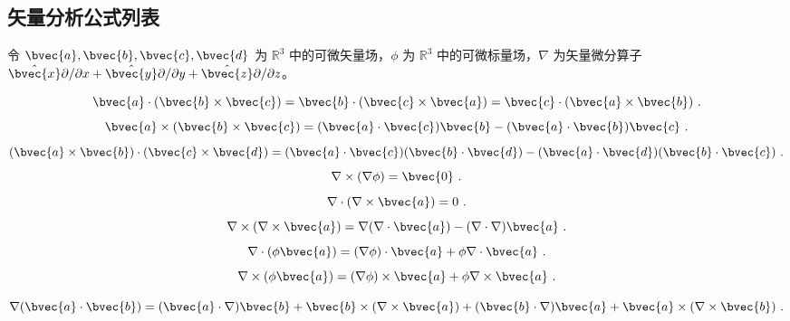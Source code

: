 
\begin{issues}
\end{issues}

\subsection{矢量分析公式列表}

令 $\bvec{a}, \bvec{b}, \bvec{c}, \bvec{d}$ 为 $\mathbb{R}^3$ 中的可微矢量场，$\phi$ 为 $\mathbb{R}^3$ 中的可微标量场，$\nabla$ 为矢量微分算子 $\hat{\bvec{x}}\partial/\partial{x}+\hat{\bvec{y}}\partial/\partial{y}+\hat{\bvec{z}}\partial/\partial{z}$。

\begin{equation}
\bvec{a}\cdot(\bvec{b}\times\bvec{c})=\bvec{b}\cdot(\bvec{c}\times\bvec{a})=\bvec{c}\cdot(\bvec{a}\times\bvec{b})~.
\end{equation}
\begin{equation}
\bvec{a}\times(\bvec{b}\times\bvec{c})=(\bvec{a}\cdot\bvec{c})\bvec{b}-(\bvec{a}\cdot\bvec{b})\bvec{c}~.
\end{equation}
\begin{equation}
(\bvec{a}\times\bvec{b})\cdot(\bvec{c}\times\bvec{d})=(\bvec{a}\cdot\bvec{c})(\bvec{b}\cdot\bvec{d})-(\bvec{a}\cdot\bvec{d})(\bvec{b}\cdot\bvec{c})~.
\end{equation}
\begin{equation}
\nabla\times(\nabla\phi)=\bvec{0}~.
\end{equation}
\begin{equation}
\nabla\cdot(\nabla\times\bvec{a})=0~.
\end{equation}
\begin{equation}
\nabla\times(\nabla\times\bvec{a})=\nabla(\nabla\cdot\bvec{a})-(\nabla\cdot\nabla)\bvec{a}~.
\end{equation}
\begin{equation}
\nabla\cdot(\phi\bvec{a})=(\nabla\phi)\cdot\bvec{a}+\phi\nabla\cdot\bvec{a}~.
\end{equation}
\begin{equation}
\nabla\times(\phi\bvec{a})=(\nabla\phi)\times\bvec{a}+\phi\nabla\times\bvec{a}~.
\end{equation}

\begin{equation}\label{eq_VecAnl_15}
\nabla(\bvec{a}\cdot\bvec{b})=(\bvec{a}\cdot\nabla)\bvec{b}+\bvec{b}\times(\nabla\times\bvec{a})+(\bvec{b}\cdot\nabla)\bvec{a}+\bvec{a}\times(\nabla\times\bvec{b})~.
\end{equation}


